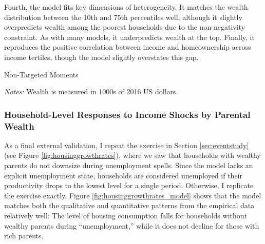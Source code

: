 \documentclass[12pt]{article}
\begin{document}
Fourth, the model fits key dimensions of heterogeneity. It matches the wealth distribution between the 10th and 75th percentiles well, although it slightly overpredicts wealth among the poorest households due to the non-negativity constraint. As with many models, it underpredicts wealth at the top. Finally, it reproduces the positive correlation between income and homeownership across income tertiles, though the model slightly overstates this gap.

\begin{table}
	\begin{adjustbox}{center}
	\begin{threeparttable}
	\caption{Non-Targeted Moments}\label{tab:nontargeted}
	
	\footnotesize 
	\textit{Notes:} Wealth is measured in 1000s of 2016 US dollars.
	\end{threeparttable}
\end{adjustbox}
	\end{table}

\subsubsection{Household-Level Responses to Income Shocks by Parental Wealth}
As a final external validation, I repeat the exercise in Section \ref{sec:eventstudy} (see Figure \ref{fig:housinggrowthrates}), where we saw that households with wealthy parents do not downsize during unemployment spells. Since the model lacks an explicit unemployment state, households are considered unemployed if their productivity drops to the lowest level for a single period. Otherwise, I replicate the exercise exactly. Figure \ref{fig:housinggrowthrates_model} shows that the model matches both the qualitative and quantitative patterns from the empirical data relatively well: The level of housing consumption falls for households without wealthy parents during ``unemployment,'' while it does not decline for those with rich parents. 
\end{document}
